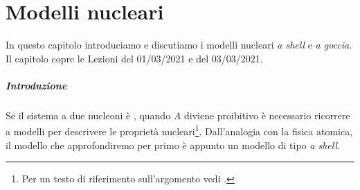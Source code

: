 \chapter{Modelli nucleari}
In questo capitolo introduciamo e discutiamo i modelli nucleari \textit{a shell} e \textit{a goccia}. Il capitolo copre le Lezioni del 01/03/2021 e del 03/03/2021.

\paragraph{Introduzione} Se il sistema a due nucleoni è , quando $A$ diviene proibitivo è necessario ricorrere a modelli per descrivere le proprietà nucleari\footnote{Per un testo di riferimento sull'argomento vedi .}. Dall'analogia con la fisica atomica, il modello  che approfondiremo per primo è appunto un modello di tipo \textit{a shell}.

